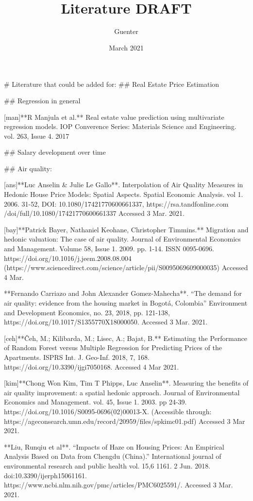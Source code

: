 \documentclass{article}
\title{Literature DRAFT}
\author{Guenter}
\date{March 2021}
\begin{document}
\maketitle

\begin{markdown}
# Literature that could be added for:
## Real Estate Price Estimation

## Regression in general

[man]**R Manjula et al.** Real estate value prediction using multivariate regression models. IOP Converence Series: Materials Science and Engineering. vol. 263, Issue 4. 2017



## Salary development over time

## Air quality:

[ans]**Luc Anselin & Julie Le Gallo**. Interpolation of Air Quality Measures in Hedonic House Price Models: Spatial Aspects. Spatial Economic Analysis. vol 1. 2006. 31-52, DOI: 10.1080/17421770600661337, https://rsa.tandfonline.com /doi/full/10.1080/17421770600661337 Accessed 3 Mar. 2021.

[bay]**Patrick Bayer, Nathaniel Keohane, Christopher Timmins.** Migration and hedonic valuation: The case of air quality. Journal of Environmental Economics and Management. Volume 58, Issue 1. 2009. pp. 1-14. ISSN 0095-0696. https://doi.org/10.1016/j.jeem.2008.08.004 (https://www.sciencedirect.com/science/article/pii/S0095069609000035) Accessed 4 Mar.

**Fernando Carriazo and John Alexander Gomez-Mahecha**. “The demand for air quality: evidence from the
housing market in Bogotá, Colombia” Environment and Development Economics, no. 23, 2018, pp. 121-138,  https://doi.org/10.1017/S1355770X18000050. Accessed 3 Mar. 2021.

[ceh]**Čeh, M.; Kilibarda, M.; Lisec, A.; Bajat, B.** Estimating the Performance of Random Forest versus Multiple Regression for Predicting Prices of the Apartments. ISPRS Int. J. Geo-Inf. 2018, 7, 168. https://doi.org/10.3390/ijgi7050168. Accessed 4 Mar 2021.


[kim]**Chong Won Kim, Tim T Phipps, Luc Anselin**. Measuring the benefits of air quality improvement: a spatial hedonic approach. Journal of Environmental Economics and Management. vol. 45, Issue 1. 2003. pp 24-39. https://doi.org/10.1016/S0095-0696(02)00013-X. (Accessible through: https://ageconsearch.umn.edu/record/20959/files/spkimc01.pdf) Accessed 3 Mar 2021.

**Liu, Runqiu et al**. “Impacts of Haze on Housing Prices: An Empirical Analysis Based on Data from Chengdu (China).” International journal of environmental research and public health vol. 15,6 1161. 2 Jun. 2018. doi:10.3390/ijerph15061161. https://www.ncbi.nlm.nih.gov/pmc/articles/PMC6025591/. Accessed 3 Mar. 2021.


\end{markdown}
\end{document}
